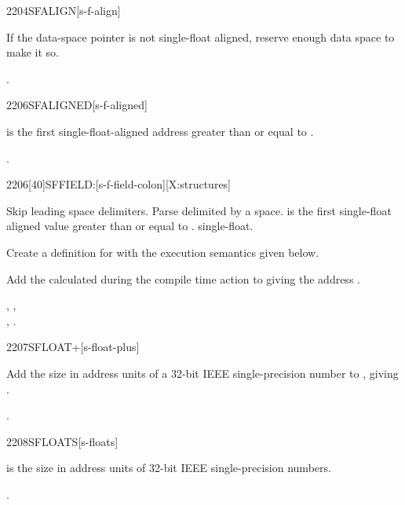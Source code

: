 \begin{worddef}{2204}{SFALIGN}[s-f-align]
\item \stack{}{}

	If the data-space pointer is not single-float aligned, reserve
	enough data space to make it so.

\see {}.
\end{worddef}


\begin{worddef}{2206}{SFALIGNED}[s-f-aligned]
\item {}

	 is the first single-float-aligned address greater
	than or equal to .

\see {}.
\end{worddef}


\begin{worddef}{2206}[40]{SFFIELD:}[s-f-field-colon][X:structures]
\item {}

	Skip leading space delimiters. Parse  delimited by
	a space.  is the first single-float aligned value
	greater than or equal to .  
	single-float.

	Create a definition for  with the execution semantics
	given below.

\execute[name]

	Add the  calculated during the compile time action to
	 giving the address .

\see {},
	, \\
	,
	.
\end{worddef}


\begin{worddef}{2207}{SFLOAT+}[s-float-plus]
\item {}

	Add the size in address units of a 32-bit IEEE single-precision
	number to , giving .

\see {}.
\end{worddef}


\begin{worddef}{2208}{SFLOATS}[s-floats]
\item {}

	 is the size in address units of  32-bit IEEE
	single-precision numbers.

\see {}.
\end{worddef}
